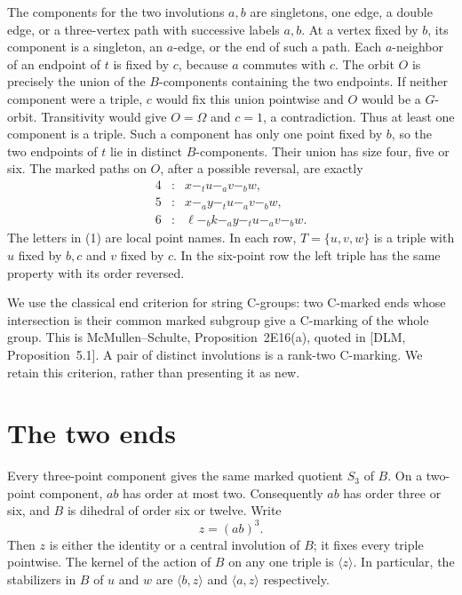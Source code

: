 \documentclass[a4paper,11pt]{article}
\newcommand{\gen}[1]{\langle#1\rangle}
\begin{document}
The components for the two involutions $a,b$ are singletons, one edge,
a double edge, or a three-vertex path with successive labels $a,b$.
At a vertex fixed by $b$, its component is a singleton, an $a$-edge,
or the end of such a path. Each $a$-neighbor of an endpoint of $t$
is fixed by $c$, because $a$ commutes with $c$. The orbit $O$ is precisely
the union of the $B$-components containing the two endpoints. If neither
component were a triple, $c$ would fix this union pointwise and $O$ would
be a $G$-orbit. Transitivity would give $O=\Omega$ and $c=1$, a contradiction.
Thus at least one component is a triple. Such a component has only one
point fixed by $b$, so the two endpoints of $t$ lie in distinct
$B$-components. Their union has size four, five or six. The marked paths
on $O$, after a possible reversal, are exactly
\[
\begin{array}{ccl}
4&:&x\mathrel{-_t}u\mathrel{-_a}v\mathrel{-_b}w,\\
5&:&x\mathrel{-_a}y\mathrel{-_t}u\mathrel{-_a}v\mathrel{-_b}w,\\
6&:&\ell\mathrel{-_b}k\mathrel{-_a}y\mathrel{-_t}u
                   \mathrel{-_a}v\mathrel{-_b}w.
\end{array}                                                    \tag{1}
\]
The letters in (1) are local point names. In each row, $T=\{u,v,w\}$ is a triple with
$u$ fixed by $b,c$ and $v$ fixed by $c$. In the six-point row the left
triple has the same property with its order reversed.

We use the classical end criterion for string C-groups: two C-marked
ends whose intersection is their common marked subgroup give a C-marking
of the whole group. This is McMullen--Schulte, Proposition~2E16(a),
quoted in [DLM, Proposition~5.1]. A pair of distinct involutions is a
rank-two C-marking. We retain this criterion, rather than presenting it
as new.

\section{The two ends}
Every three-point component gives the same marked quotient $S_3$ of $B$.
On a two-point component, $ab$ has order at most two. Consequently $ab$
has order three or six, and $B$ is dihedral of order six or twelve.
Write
\[
 z=(ab)^3.
\]
Then $z$ is either the identity or a central involution of $B$; it fixes
every triple pointwise. The kernel of the action of $B$ on any one triple
is $\gen z$. In particular, the stabilizers in $B$ of $u$ and $w$ are
$\gen{b,z}$ and $\gen{a,z}$ respectively.
\end{document}
